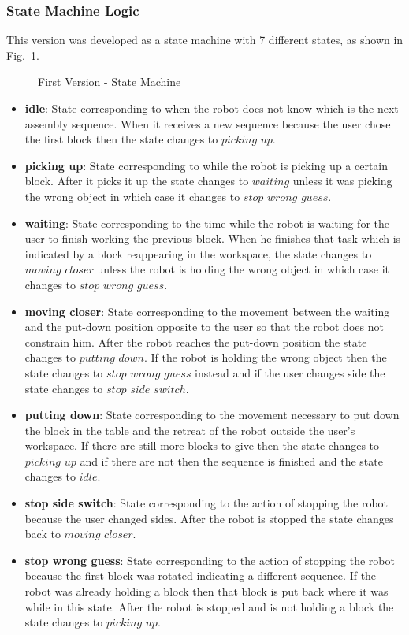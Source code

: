 \subsubsection{State Machine Logic}

This version was developed as a state machine with 7 different states, as shown in Fig.~\ref{fig:demo1_state_machine}.

\begin{figure}[H]%
    \centering
    
    \caption{First Version - State Machine}
    \label{fig:demo1_state_machine}
\end{figure}

\begin{itemize}
    \item \textbf{idle}: State corresponding to when the robot does not know which is the next assembly sequence. When it receives a new sequence because the user chose the first block then the state changes to $picking$ $up$.
    \item \textbf{picking up}: State corresponding to while the robot is picking up a certain block. After it picks it up the state changes to $waiting$ unless it was picking the wrong object in which case it changes to $stop$ $wrong$ $guess$.
    \item \textbf{waiting}: State corresponding to the time while the robot is waiting for the user to finish working the previous block. When he finishes that task which is indicated by a block reappearing in the workspace, the state changes to $moving$ $closer$ unless the robot is holding the wrong object in which case it changes to $stop$ $wrong$ $guess$.
    \item \textbf{moving closer}: State corresponding to the movement between the waiting and the put-down position opposite to the user so that the robot does not constrain him. After the robot reaches the put-down position the state changes to $putting$ $down$. If the robot is holding the wrong object then the state changes to $stop$ $wrong$ $guess$ instead and if the user changes side the state changes to $stop$ $side$ $switch$.
    \item \textbf{putting down}: State corresponding to the movement necessary to put down the block in the table and the retreat of the robot outside the user's workspace. If there are still more blocks to give then the state changes to $picking$ $up$ and if there are not then the sequence is finished and the state changes to $idle$.
    \item \textbf{stop side switch}: State corresponding to the action of stopping the robot because the user changed sides. After the robot is stopped the state changes back to $moving$ $closer$.
    \item \textbf{stop wrong guess}: State corresponding to the action of stopping the robot because the first block was rotated indicating a different sequence. If the robot was already holding a block then that block is put back where it was while in this state. After the robot is stopped and is not holding a block the state changes to $picking$ $up$.
\end{itemize}

